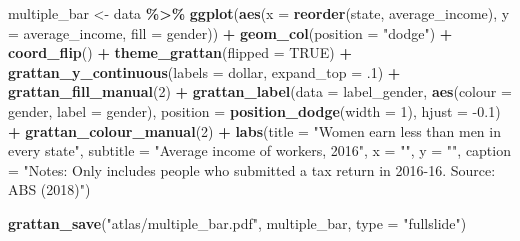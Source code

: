 \documentclass[
]{book}
\newenvironment{Shaded}{\begin{snugshade}}{\end{snugshade}}
\newcommand{\DataTypeTok}[1]{\textcolor[rgb]{0.13,0.29,0.53}{#1}}
\newcommand{\DecValTok}[1]{\textcolor[rgb]{0.00,0.00,0.81}{#1}}
\newcommand{\FloatTok}[1]{\textcolor[rgb]{0.00,0.00,0.81}{#1}}
\newcommand{\KeywordTok}[1]{\textcolor[rgb]{0.13,0.29,0.53}{\textbf{#1}}}
\newcommand{\NormalTok}[1]{#1}
\newcommand{\OperatorTok}[1]{\textcolor[rgb]{0.81,0.36,0.00}{\textbf{#1}}}
\newcommand{\OtherTok}[1]{\textcolor[rgb]{0.56,0.35,0.01}{#1}}
\newcommand{\StringTok}[1]{\textcolor[rgb]{0.31,0.60,0.02}{#1}}
\begin{document}
\begin{Shaded}
\begin{Highlighting}[]
\NormalTok{multiple\_bar \textless{}{-}}\StringTok{ }\NormalTok{data }\OperatorTok{\%\textgreater{}\%}\StringTok{ }
\StringTok{  }\KeywordTok{ggplot}\NormalTok{(}\KeywordTok{aes}\NormalTok{(}\DataTypeTok{x =} \KeywordTok{reorder}\NormalTok{(state, average\_income), }
             \DataTypeTok{y =}\NormalTok{ average\_income,}
             \DataTypeTok{fill =}\NormalTok{ gender)) }\OperatorTok{+}\StringTok{ }
\StringTok{  }\KeywordTok{geom\_col}\NormalTok{(}\DataTypeTok{position =} \StringTok{"dodge"}\NormalTok{) }\OperatorTok{+}\StringTok{ }
\StringTok{  }\KeywordTok{coord\_flip}\NormalTok{() }\OperatorTok{+}\StringTok{ }
\StringTok{  }\KeywordTok{theme\_grattan}\NormalTok{(}\DataTypeTok{flipped =} \OtherTok{TRUE}\NormalTok{) }\OperatorTok{+}\StringTok{ }
\StringTok{  }\KeywordTok{grattan\_y\_continuous}\NormalTok{(}\DataTypeTok{labels =}\NormalTok{ dollar, }
                       \DataTypeTok{expand\_top =} \FloatTok{.1}\NormalTok{) }\OperatorTok{+}\StringTok{ }
\StringTok{  }\KeywordTok{grattan\_fill\_manual}\NormalTok{(}\DecValTok{2}\NormalTok{) }\OperatorTok{+}\StringTok{ }
\StringTok{  }\KeywordTok{grattan\_label}\NormalTok{(}\DataTypeTok{data =}\NormalTok{ label\_gender, }
                \KeywordTok{aes}\NormalTok{(}\DataTypeTok{colour =}\NormalTok{ gender,}
                    \DataTypeTok{label =}\NormalTok{ gender), }
                \DataTypeTok{position =} \KeywordTok{position\_dodge}\NormalTok{(}\DataTypeTok{width =} \DecValTok{1}\NormalTok{), }
                \DataTypeTok{hjust =} \FloatTok{{-}0.1}\NormalTok{) }\OperatorTok{+}\StringTok{ }
\StringTok{  }\KeywordTok{grattan\_colour\_manual}\NormalTok{(}\DecValTok{2}\NormalTok{) }\OperatorTok{+}\StringTok{ }
\StringTok{  }\KeywordTok{labs}\NormalTok{(}\DataTypeTok{title =} \StringTok{"Women earn less than men in every state"}\NormalTok{,}
       \DataTypeTok{subtitle =} \StringTok{"Average income of workers, 2016"}\NormalTok{,}
       \DataTypeTok{x =} \StringTok{""}\NormalTok{,}
       \DataTypeTok{y =} \StringTok{""}\NormalTok{,}
       \DataTypeTok{caption =} \StringTok{"Notes: Only includes people who submitted a tax return in 2016{-}16. Source: ABS (2018)"}\NormalTok{)}
\end{Highlighting}
\end{Shaded}

\begin{Shaded}
\begin{Highlighting}[]
\KeywordTok{grattan\_save}\NormalTok{(}\StringTok{"atlas/multiple\_bar.pdf"}\NormalTok{, multiple\_bar, }\DataTypeTok{type =} \StringTok{"fullslide"}\NormalTok{)}
\end{Highlighting}
\end{Shaded}
\end{document}
